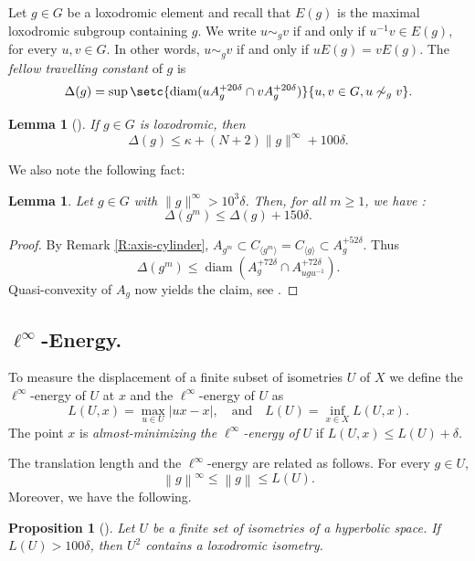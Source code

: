 \documentclass[leqno,a4paper,10pt]{amsart}
\theoremstyle{plain}
\newtheorem{prop}[thm]{Proposition}
\newtheorem{lem}[thm]{Lemma}
\theoremstyle{definition}
\theoremstyle{remark}
\DeclareMathOperator{\diam}{diam}
\renewcommand{\leq}{\leqslant}
\let\le\leqslant
\let\leq\leqslant
\newcommand{\stlen}[1]{
	\left\| #1\right\|^{\infty}
}
\newcommand{\tlen}[1]{
	\left\| #1\right\|
}
\begin{document}
Let $g\in G$ be a loxodromic element and recall that $E(g)$ is the maximal loxodromic subgroup containing $g$.  
We write $u\sim_g v$ if and only if $u^{-1}v \in E(g)$, for every $u,v\in G$. In other words,  $u\sim_g v$ if and only if $uE(g)=vE(g)$.
The \emph{fellow travelling constant} of $g$ is
$$\Delta(g)=\sup  \setc{\diam(uA_g^{+20\delta}\cap vA_g^{+20\delta})}{ u,v\in G, u\not\sim_g v}.$$


\begin{lem}[]
	\label{lem:acylindricity-intersection-axis} 
	 If $g\in G$ is loxodromic, then
	$$\Delta(g)\le \kappa+(N+2)\|g\|^{\infty}+100\delta.$$
\end{lem}

We also note the following fact:
\begin{lem}\label{L: axis} Let $g\in G$ with $\|g\|^{\infty}>10^3 \delta$. Then, for all $m\geqslant 1$, we have :
$$ \Delta (g^m)\leqslant \Delta(g) + 150\delta.$$
\end{lem}
\begin{proof}
By Remark \ref{R:axis-cylinder}, $A_{g^m}\subset C_{\langle g^m\rangle}=C_{\langle g\rangle}\subset A_g^{+52\delta}$. Thus
$$\Delta(g^m)\leq \diam\left(A_{g}^{+72\delta} \cap A_{ugu^{-1}}^{+72\delta}\right).$$ 
Quasi-convexity of $A_g$ now yields the claim, see  \cite[Lemma~2.2.2~(2)]{delzant_courbure_2008}. 
\end{proof}


\subsection{$\ell^{\infty}$-Energy.} 

To measure the displacement of a finite subset of isometries $U $ of $X$ we define the $\ell^{\infty}$-energy of $U$ at $x$ and the $\ell^{\infty}$-energy of $U$ as 
$$
L(U,x) = \max_{u\in U} |ux-x|, 
\quad \text{and} \quad
L(U)=\inf_{x\in X} L(U,x).
$$
The point $x$ is \emph{almost-minimizing the $\ell^{\infty}$-energy of} $U$ if $L(U,x)\le L(U)+\delta$. 

The translation length and the $\ell^{\infty}$-energy are related as follows. For every $g\in U$,
\begin{equation}	
	\label{eqn:energy and translation length}
	\stlen g \le \tlen{g} \le L(U).
\end{equation}
Moreover, we have the following.

\begin{prop}[]\label{P:koubi} Let $U$ be a finite set of isometries of a hyperbolic space. If $L(U)>100\delta$, then $U^2$ contains a loxodromic isometry.
\end{prop}
\end{document}
